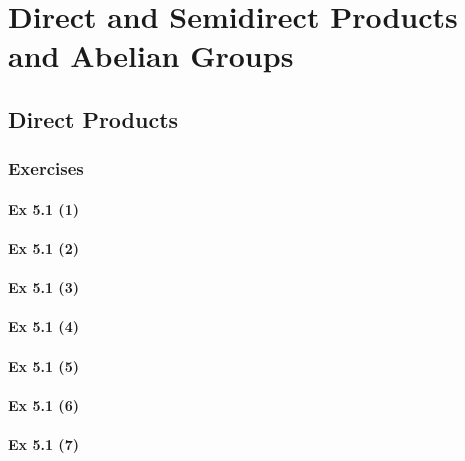\setcounter{chapter}{0}
\renewcommand{\thechapter}{5}
\chapter{Direct and Semidirect Products and Abelian Groups}\label{ch:5}
\setcounter{equation}{0}	        %

\section{Direct Products}\label{sec:5.1}	
\subsection*{Exercises}\label{sec:5.1_Exercises}

\subsubsection{Ex 5.1 (1)}\label{sec:Ex_5.1.1}

\subsubsection{Ex 5.1 (2)}\label{sec:Ex_5.1.2}

\subsubsection{Ex 5.1 (3)}\label{sec:Ex_5.1.3}

\subsubsection{Ex 5.1 (4)}\label{sec:Ex_5.1.4}

\subsubsection{Ex 5.1 (5)}\label{sec:Ex_5.1.5}

\subsubsection{Ex 5.1 (6)}\label{sec:Ex_5.1.6}

\subsubsection{Ex 5.1 (7)}\label{sec:Ex_5.1.7}

